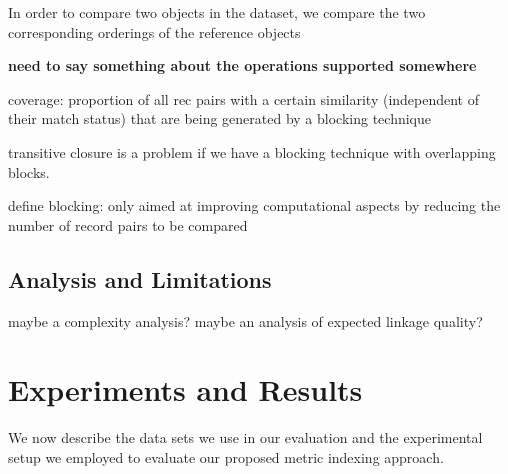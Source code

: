 \documentclass{llncs}
\begin{document}
In order to compare two objects in the dataset, we compare the two corresponding orderings of the reference objects

{\textbf{need to say something about the operations supported somewhere}}

coverage: proportion of all rec pairs with a certain similarity
(independent of their match status) that are being generated by
a blocking  technique

transitive closure is a problem if we have a blocking technique with overlapping blocks.

define blocking: only aimed at improving computational aspects by reducing the number of record pairs to be compared










\subsection{Analysis and Limitations}
\label{sec-analysis}

maybe a complexity analysis? maybe an analysis of expected 
linkage quality?


\section{Experiments and Results}
\label{sec-data}

We now describe the data sets we use in our evaluation and the
experimental setup we employed to evaluate our proposed metric
indexing approach.



\end{document}
